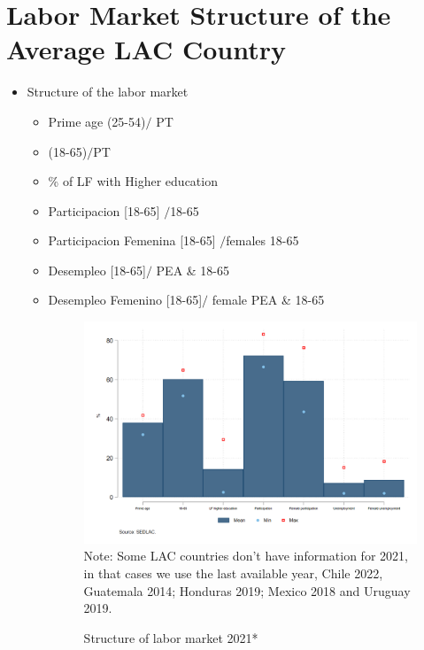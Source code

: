 \documentclass[english]{article}
\begin{document}
\section{Labor Market Structure of the Average LAC Country}
\begin{itemize}
    \item Structure of the labor market 
    \begin{itemize}
        \item Prime age (25-54)$/$ PT
        \item (18-65)$/$PT
        \item \% of LF with Higher education
        \item Participacion [18-65] $/$18-65
        \item Participacion Femenina [18-65] $/$females 18-65
        \item Desempleo [18-65]$/$ PEA \& 18-65
        \item Desempleo Femenino [18-65]$/$ female PEA \& 18-65
        \begin{figure}[!htb]
        \centering
        \caption{Structure of labor market 2021*}     
        \includegraphics[scale=.3]{latex/figures/Snapshot/Structure of labor market.png}
        \label{fig:Structure of labor market}
        \footnotesize{Note: Some LAC countries don’t have information for 2021, in that cases we use the last available year, Chile 2022, Guatemala 2014; Honduras 2019; Mexico 2018 and Uruguay 2019.}
        \end{figure}
        

\end{itemize}
\end{itemize}
\end{document}
